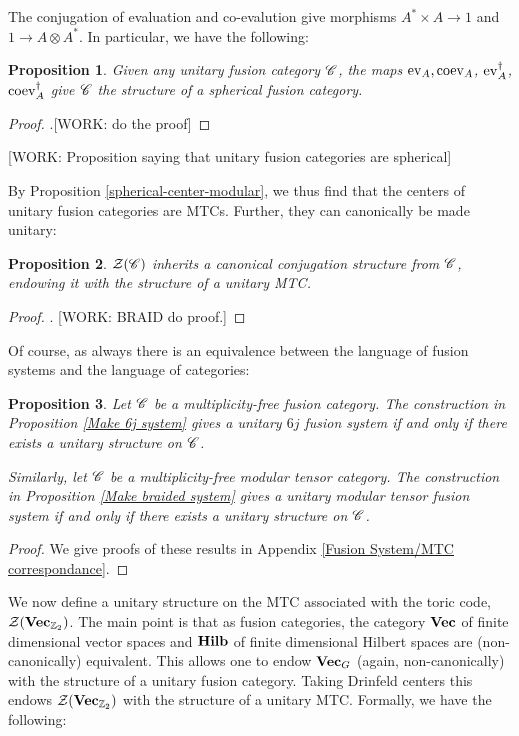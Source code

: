 \documentclass{article}
\newtheorem{proposition}{Proposition}[section]
\theoremstyle{definition}
\numberwithin{figure}{section}
\begin{document}
The conjugation of evaluation and co-evalution give morphisms $A^{*}\times A\to 1$ and $1\to A\otimes A^{*}$. In particular, we have the following:

\begin{proposition} Given any unitary fusion category $\mathscr{C}$, the maps $\mathrm{ev}_{A},\mathrm{coev}_{A}$, $\mathrm{ev}^{\dagger}_{A}$, $\mathrm{coev}^{\dagger}_A$ give $\mathscr{C}$ the structure of a spherical fusion category.
\end{proposition}
\begin{proof}.[WORK: do the proof]
\end{proof}

[WORK: Proposition saying that unitary fusion categories are spherical]

By Proposition \ref{spherical-center-modular}, we thus find that the centers of unitary fusion categories are MTCs. Further, they can canonically be made unitary:

\begin{proposition}\label{unitary MTC}$ \mathcal{Z}(\mathscr{C})$ inherits a canonical conjugation structure from $\mathscr{C}$, endowing it with the structure of a unitary MTC.
\end{proposition}
\begin{proof}. [WORK: BRAID do proof.]
\end{proof}

Of course, as always there is an equivalence between the language of fusion systems and the language of categories:

\begin{proposition}\label{Make uMTC} Let $\mathscr{C}$ be a multiplicity-free fusion category. The construction in Proposition \ref{Make 6j system} gives a unitary $6j$ fusion system if and only if there exists a unitary structure on $\mathscr{C}$.

Similarly, let $\mathscr{C}$ be a multiplicity-free modular tensor category. The construction in Proposition \ref{Make braided system} gives a unitary modular tensor fusion system if and only if there exists a unitary structure on $\mathscr{C}$.
\end{proposition}
\begin{proof} We give proofs of these results in Appendix \ref{Fusion System/MTC correspondance}.
\end{proof}

We now define a unitary structure on the MTC associated with the toric code, $\mathcal{Z}(\bold{Vec}_{\mathbb{Z}_2})$. The main point is that as fusion categories, the category $\bold{Vec}$ of finite dimensional vector spaces and $\bold{Hilb}$ of finite dimensional Hilbert spaces are (non-canonically) equivalent. This allows one to endow $\bold{Vec}_{G}$ (again, non-canonically) with the structure of a unitary fusion category. Taking Drinfeld centers this endows $\mathcal{Z}(\bold{Vec}_{\mathbb{Z}_2})$ with the structure of a unitary MTC. Formally, we have the following:
\end{document}
